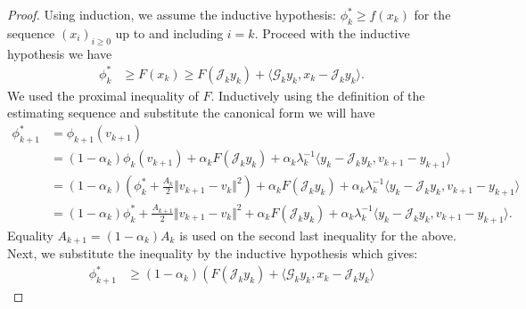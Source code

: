 \documentclass[12pt]{article}
\begin{document}
        \begin{proof}   
            Using induction, we assume the inductive hypothesis: $\phi_k^* \ge f(x_k)$ for the sequence $(x_i)_{i \ge 0}$ up to and including $i = k$.
            Proceed with the inductive hypothesis we have 
            \begin{align*}
                \phi_k^* 
                &\ge F(x_k)
                \ge F(\mathcal J_k y_k) + \langle \mathcal G_k y_k, x_k - \mathcal J_k y_k\rangle. 
            \end{align*}
            We used the proximal inequality of $F$. 
            Inductively using the definition of the estimating sequence and substitute the canonical form we will have 
            \begin{align*}
                \phi_{k + 1}^*
                &= \phi_{k + 1}(v_{k + 1})
                \\
                &= 
                (1 - \alpha_k) \phi_k(v_{k + 1})
                + \alpha_kF(\mathcal J_k y_k)
                + \alpha_k\lambda_k^{-1}\langle 
                    y_k - \mathcal J_k y_k, v_{k + 1} - y_{k + 1}
                \rangle
                \\
                &= 
                \left(
                    1 - \alpha_k
                \right)\left(
                    \phi_k^* + \frac{A_k}{2}\Vert v_{k + 1} - v_k\Vert^2
                \right)
                + 
                \alpha_k F(\mathcal J_k y_k) 
                + 
                \alpha_k\lambda_k^{-1}\langle 
                    y_k - \mathcal J_k y_k, v_{k + 1} - y_{k + 1}
                \rangle
                \\
                &=
                (1 - \alpha_k)\phi_k^*
                + 
                \frac{A_{k + 1}}{2}\Vert v_{k + 1} - v_k\Vert^2
                + \alpha_k F(\mathcal J_k y_k)
                + \alpha_k\lambda_k^{-1}\langle 
                    y_k - \mathcal J_k y_k, v_{k + 1} - y_{k + 1}
                \rangle. 
            \end{align*}
            Equality $A_{k + 1} = (1 - \alpha_k)A_k$ is used on the second last inequality for the above. 
            Next, we substitute the inequality by the inductive hypothesis which gives: 
            {\small
            \begin{align*}
                \phi_{k + 1}^*
                &\ge 
                (1 - \alpha_k)
                \left(
                    F(\mathcal J_k y_k) + \langle \mathcal G_k y_k, x_k - \mathcal J_k y_k\rangle

\end{align*}}
\end{proof}
\end{document}
